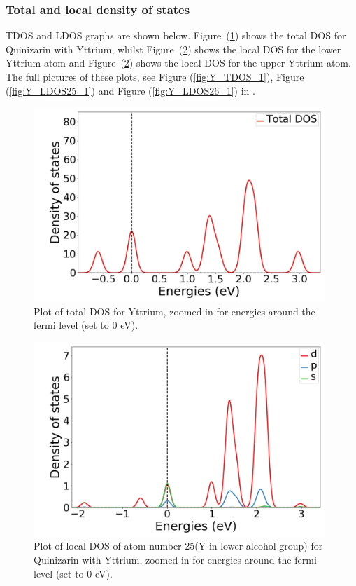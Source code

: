 \documentclass{article}
\begin{document}
      \vspace{1cm}

    \subsubsection{Total and local density of states}

      TDOS and LDOS graphs are shown below. Figure~(\ref{fig:Y_TDOS_2}) shows the total DOS for Quinizarin with Yttrium, whilst Figure~(\ref{fig:Y_LDOS25_2}) shows the local DOS for the lower Yttrium atom and Figure~(\ref{fig:Y_LDOS25_2}) shows the local DOS for the upper Yttrium atom.
      The full pictures of these plots, see Figure (\ref{fig:Y_TDOS_1}), Figure (\ref{fig:Y_LDOS25_1}) and Figure (\ref{fig:Y_LDOS26_1}) in . \\

      \begin{figure}[H]
        \centering
        \includegraphics[width = 11cm]{../fig/Y_TDOS_2.png}
        \caption{Plot of total DOS for Yttrium, zoomed in for energies around the fermi level (set to 0 eV). }
        \label{fig:Y_TDOS_2}
      \end{figure}

      \begin{figure}[H]
        \centering
        \includegraphics[width = 11cm]{../fig/Y_LDOS25_2.png}
        \caption{Plot of local DOS of atom number 25(Y in lower alcohol-group) for Quinizarin with Yttrium, zoomed in for energies around the fermi level (set to 0 eV). }
        \label{fig:Y_LDOS25_2}
      \end{figure}
\end{document}
